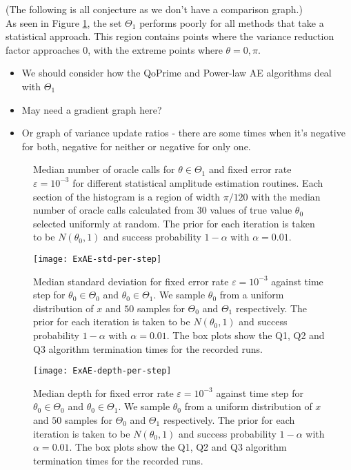 \begin{center}
	\color{red}
	(The following is all conjecture as we don't have a comparison graph.) \\
As seen in Figure \ref{fig::ExAE-converge-on-theta1}, the set $\Theta_1$ performs poorly for all methods that take a statistical approach. This region contains points where the variance reduction factor approaches 0, with the extreme points where $\theta= 0, \pi$. 
\begin{itemize}
	\color{red}
	\item We should consider how the QoPrime and Power-law AE algorithms deal with $\Theta_1$
	\item May need a gradient graph here?
	\item Or graph of variance update ratios - there are some times when it's negative for both, negative for neither or negative for only one.
\end{itemize}
\end{center}

\begin{figure}[htbp]
	\centering
	\caption{Median number of oracle calls for $\theta \in \Theta_1$ and fixed error rate $\varepsilon = 10^{-3}$ for different statistical amplitude estimation routines. Each section of the histogram is a region of width $\pi/120$ with the median number of oracle calls calculated from 30 values of true value $\theta_0$ selected uniformly at random. The prior for each iteration is taken to be $N(\theta_0, 1)$ and success probability $1 - \alpha$ with $\alpha = 0.01$.}
	\label{fig::ExAE-converge-on-theta1}
\end{figure}

\begin{figure}[htbp]
	\centering
	\texttt{[image: ExAE-std-per-step]}
	\caption{Median standard deviation for fixed error rate $\varepsilon = 10^{-3}$ against time step for $\theta_0 \in \Theta_0$ and $\theta_0 \in \Theta_1$. We sample $\theta_0$ from a uniform distribution of $x$ and $50$ samples for $\Theta_0$ and $ \Theta_1$ respectively. The prior for each iteration is taken to be $N(\theta_0, 1)$ and success probability $1 - \alpha$ with $\alpha = 0.01$. The box plots show the Q1, Q2 and Q3 algorithm termination times for the recorded runs.}
	\label{fig::ExAE-std-per-step}
\end{figure}

\begin{figure}[htbp]
	\centering
	\texttt{[image: ExAE-depth-per-step]}
	\caption{Median depth for fixed error rate $\varepsilon = 10^{-3}$ against time step for $\theta_0 \in \Theta_0$ and $\theta_0 \in \Theta_1$. We sample $\theta_0$ from a uniform distribution of $x$ and $50$ samples for $\Theta_0$ and $ \Theta_1$ respectively. The prior for each iteration is taken to be $N(\theta_0, 1)$ and success probability $1 - \alpha$ with $\alpha = 0.01$. The box plots show the Q1, Q2 and Q3 algorithm termination times for the recorded runs.}
	\label{fig::ExAE-depth-per-step}
\end{figure}

